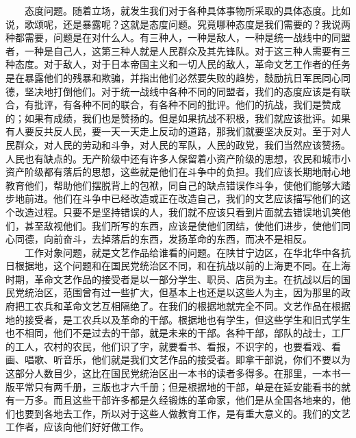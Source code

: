 \documentclass[cn,11pt,chinese]{elegantbook}
\begin{document}
　　态度问题。随着立场，就发生我们对于各种具体事物所采取的具体态度。比如说，歌颂呢，还是暴露呢？这就是态度问题。究竟哪种态度是我们需要的？我说两种都需要，问题是在对什么人。有三种人，一种是敌人，一种是统一战线中的同盟者，一种是自己人，这第三种人就是人民群众及其先锋队。对于这三种人需要有三种态度。对于敌人，对于日本帝国主义和一切人民的敌人，革命文艺工作者的任务是在暴露他们的残暴和欺骗，并指出他们必然要失败的趋势，鼓励抗日军民同心同德，坚决地打倒他们。对于统一战线中各种不同的同盟者，我们的态度应该是有联合，有批评，有各种不同的联合，有各种不同的批评。他们的抗战，我们是赞成的；如果有成绩，我们也是赞扬的。但是如果抗战不积极，我们就应该批评。如果有人要反共反人民，要一天一天走上反动的道路，那我们就要坚决反对。至于对人民群众，对人民的劳动和斗争，对人民的军队，人民的政党，我们当然应该赞扬。人民也有缺点的。无产阶级中还有许多人保留着小资产阶级的思想，农民和城市小资产阶级都有落后的思想，这些就是他们在斗争中的负担。我们应该长期地耐心地教育他们，帮助他们摆脱背上的包袱，同自己的缺点错误作斗争，使他们能够大踏步地前进。他们在斗争中已经改造或正在改造自己，我们的文艺应该描写他们的这个改造过程。只要不是坚持错误的人，我们就不应该只看到片面就去错误地讥笑他们，甚至敌视他们。我们所写的东西，应该是使他们团结，使他们进步，使他们同心同德，向前奋斗，去掉落后的东西，发扬革命的东西，而决不是相反。\\
　　工作对象问题，就是文艺作品给谁看的问题。在陕甘宁边区，在华北华中各抗日根据地，这个问题和在国民党统治区不同，和在抗战以前的上海更不同。在上海时期，革命文艺作品的接受者是以一部分学生、职员、店员为主。在抗战以后的国民党统治区，范围曾有过一些扩大，但基本上也还是以这些人为主，因为那里的政府把工农兵和革命文艺互相隔绝了。在我们的根据地就完全不同。文艺作品在根据地的接受者，是工农兵以及革命的干部。根据地也有学生，但这些学生和旧式学生也不相同，他们不是过去的干部，就是未来的干部。各种干部，部队的战士，工厂的工人，农村的农民，他们识了字，就要看书、看报，不识字的，也要看戏、看画、唱歌、听音乐，他们就是我们文艺作品的接受者。即拿干部说，你们不要以为这部分人数目少，这比在国民党统治区出一本书的读者多得多。在那里，一本书一版平常只有两千册，三版也才六千册；但是根据地的干部，单是在延安能看书的就有一万多。而且这些干部许多都是久经锻炼的革命家，他们是从全国各地来的，他们也要到各地去工作，所以对于这些人做教育工作，是有重大意义的。我们的文艺工作者，应该向他们好好做工作。\\
\end{document}
